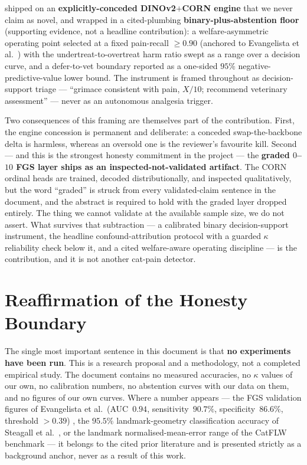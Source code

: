 \noindent shipped on an \textbf{explicitly-conceded \mbox{DINOv2$+$CORN} engine}
\cite{oquab2023dinov2,shi2023corn} that we never claim as novel, and wrapped in a
cited-plumbing \textbf{binary-plus-abstention floor} (supporting evidence, not a
headline contribution): a welfare-asymmetric operating point
selected at a fixed pain-recall $\geq 0.90$ (anchored to
Evangelista et al.\ \cite{evangelista2019}) with the undertreat-to-overtreat harm
ratio swept as a range over a decision curve, and a defer-to-vet boundary reported
as a one-sided $95\%$ negative-predictive-value lower bound. The instrument is
framed throughout as decision-support triage --- ``grimace consistent with pain,
$X/10$; recommend veterinary assessment'' --- never as an autonomous analgesia
trigger.

Two consequences of this framing are themselves part of the contribution. First,
the engine concession is permanent and deliberate: a conceded
swap-the-backbone delta is harmless, whereas an oversold one is the reviewer's
favourite kill. Second --- and this is the strongest honesty commitment in the
project --- the \textbf{graded $0$--$10$ FGS layer ships as an
inspected-not-validated artifact}. The CORN ordinal heads are trained, decoded
distributionally, and inspected qualitatively, but the word ``graded'' is struck
from every validated-claim sentence in the document, and the abstract is required
to hold with the graded layer dropped entirely. The thing we cannot validate at
the available sample size, we do not assert. What survives that subtraction --- a
calibrated binary decision-support instrument, the headline confound-attribution
protocol with a guarded $\kappa$ reliability check below it, and a cited
welfare-aware operating discipline --- is the contribution, and it is not another
cat-pain detector.

\section{Reaffirmation of the Honesty Boundary}
\label{sec:concl-honesty}

The single most important sentence in this document is that \textbf{no experiments
have been run}. This is a research proposal and a methodology, not a completed
empirical study. The document contains no measured accuracies, no $\kappa$ values
of our own, no calibration numbers, no abstention curves with our data on them,
and no figures of our own curves. Where a number appears --- the FGS validation
figures of Evangelista et al.\ (AUC~$0.94$, sensitivity~$90.7\%$,
specificity~$86.6\%$, threshold $>0.39$) \cite{evangelista2019}, the
$95.5\%$ landmark-geometry classification accuracy of Steagall et al.\
\cite{steagall2023}, or the landmark normalised-mean-error range of the CatFLW
benchmark \cite{martvel2024catflw} --- it belongs to the cited prior literature
and is presented strictly as a background anchor, never as a result of this work.

